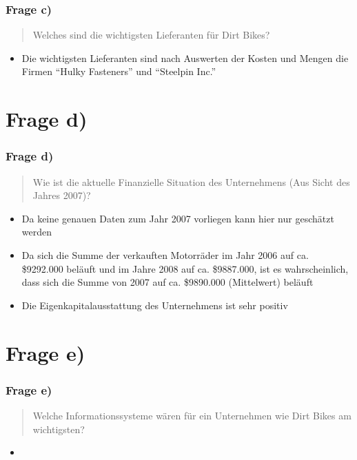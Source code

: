 \documentclass{beamer}
\begin{document}
\begin{frame}
\frametitle{Frage c)}

\begin{quote}
Welches sind die wichtigsten Lieferanten für Dirt Bikes?
\end{quote}

\begin{itemize}
\setlength{\itemsep}{14pt}
\item Die wichtigsten Lieferanten sind nach Auswerten der Kosten und Mengen die Firmen ``Hulky Fasteners'' und ``Steelpin Inc.''
\end{itemize}

\end{frame}

\section{Frage d)}
\begin{frame}
\frametitle{Frage d)}

\begin{quote}
Wie ist die aktuelle Finanzielle Situation des Unternehmens (Aus Sicht des Jahres 2007)?
\end{quote}

\begin{itemize}
\setlength{\itemsep}{14pt}
\item Da keine genauen Daten zum Jahr 2007 vorliegen kann hier nur gesch\"atzt werden
\item Da sich die Summe der verkauften Motorr\"ader im Jahr 2006 auf ca. \$9292.000 bel\"auft
und im Jahre 2008 auf ca. \$9887.000, ist es wahrscheinlich, dass sich die Summe von 2007
auf ca. \$9890.000 (Mittelwert) bel\"auft
\item Die Eigenkapitalausstattung des Unternehmens ist sehr positiv
\end{itemize}

\end{frame}

\section{Frage e)}
\begin{frame}
\frametitle{Frage e)}

\begin{quote}
Welche Informationssysteme wären für ein Unternehmen wie Dirt Bikes am wichtigsten?
\end{quote}

\begin{itemize}
\setlength{\itemsep}{14pt}
\item 
\end{itemize}

\end{frame}
\end{document}
